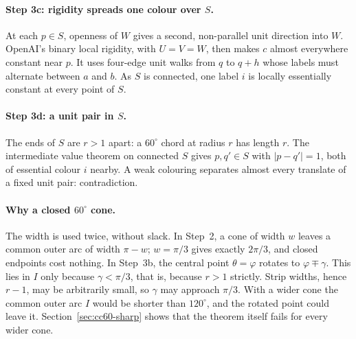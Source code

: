 \documentclass[11pt]{article}
\theoremstyle{definition}
\theoremstyle{remark}
\begin{document}
\paragraph{Step 3c: rigidity spreads one colour over $S$.} At each $p\in S$,
openness of $W$ gives a second, non-parallel unit direction into $W$.
OpenAI's binary local rigidity, with $U=V=W$, then makes $c$ almost
everywhere constant near $p$. It uses four-edge unit walks from $q$ to $q+h$
whose labels must alternate between $a$ and $b$. As $S$ is connected, one
label $i$ is locally essentially constant at every point of $S$.

\paragraph{Step 3d: a unit pair in $S$.} The ends of $S$ are $r>1$ apart:
a $60^\circ$ chord at radius $r$ has length $r$. The intermediate value
theorem on connected $S$ gives $p,q'\in S$ with $|p-q'|=1$, both of
essential colour $i$ nearby. A weak colouring separates almost every
translate of a fixed unit pair: contradiction.

\paragraph{Why a closed $60^\circ$ cone.} The width is used twice, without
slack. In Step~2, a cone of width $w$ leaves a common outer arc of width
$\pi-w$; $w=\pi/3$ gives exactly $2\pi/3$, and closed endpoints cost
nothing. In Step~3b, the central point $\theta=\varphi$ rotates to
$\varphi\mp\gamma$. This lies in $I$ only because $\gamma<\pi/3$, that is,
because $r>1$ strictly. Strip widths, hence $r-1$, may be arbitrarily small,
so $\gamma$ may approach $\pi/3$. With a wider cone the common outer arc $I$ would be shorter than $120^\circ$, and the rotated point could leave it.
Section~\ref{sec:cc60-sharp} shows that the theorem itself fails for every
wider cone.
\end{document}
